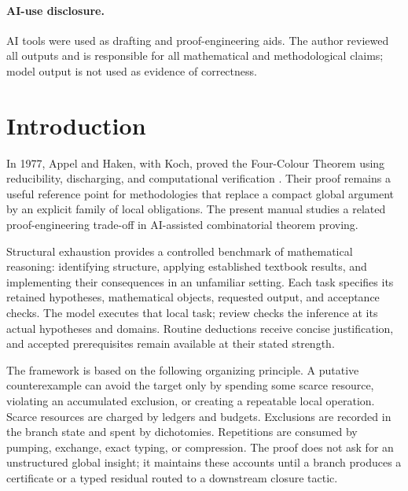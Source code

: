 \documentclass[
  11pt,
]{article}
\theoremstyle{definition}
\begin{document}
\paragraph*{AI-use disclosure.}
AI tools were used as drafting and proof-engineering aids. The author
reviewed all outputs and is responsible for all mathematical and
methodological claims; model output is not used as evidence of
correctness.

\tableofcontents

\section*{Introduction}\label{introduction}

In 1977, Appel and Haken, with Koch, proved the Four-Colour Theorem using
reducibility, discharging, and computational verification
\citep{appel-haken-1977-discharging,appel-haken-koch-1977-reducibility}.
Their proof remains a useful reference point for methodologies that
replace a compact global argument by an explicit family of local
obligations. The present manual studies a related proof-engineering
trade-off in AI-assisted combinatorial theorem proving.

Structural exhaustion provides a controlled benchmark of mathematical
reasoning: identifying structure, applying established textbook results, and
implementing their consequences in an unfamiliar setting. Each task specifies
its retained hypotheses, mathematical objects, requested output, and acceptance
checks. The model executes that local task; review checks the inference at its
actual hypotheses and domains. Routine deductions receive concise justification,
and accepted prerequisites remain available at their stated strength.

The framework is based on the following organizing principle. A putative
counterexample can avoid the target only by spending some scarce
resource, violating an accumulated exclusion, or creating a repeatable
local operation. Scarce resources are charged by ledgers and budgets.
Exclusions are recorded in the branch state and spent by dichotomies.
Repetitions are consumed by pumping, exchange, exact typing, or
compression. The proof does not ask for an unstructured global insight;
it maintains these accounts until a branch produces a certificate or a
typed residual routed to a downstream closure tactic.
\end{document}
